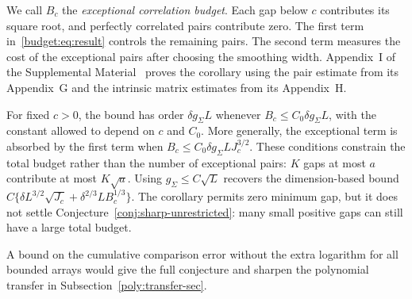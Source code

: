 \documentclass[11pt,letterpaper,twoside,leqno]{article}
\theoremstyle{bookplain}
\theoremstyle{bookremark}
\begin{document}
We call $B_c$ the \emph{exceptional correlation budget}. Each gap
below $c$ contributes its square root, and perfectly correlated pairs
contribute zero. The first term in~\eqref{budget:eq:result} controls
the remaining pairs. The second term measures the cost of the
exceptional pairs after choosing the smoothing width. Appendix~I of the
Supplemental Material~\cite{Supplement2026} proves the corollary using
the pair estimate from its Appendix~G and the intrinsic matrix estimates
from its Appendix~H.

For fixed $c>0$, the bound has order $\delta g_\Sigma L$ whenever
$B_c\le C_0\delta g_\Sigma L$, with the constant allowed to depend
on $c$ and $C_0$. More generally, the exceptional term is absorbed
by the first term when $B_c\le C_0\delta g_\Sigma LJ_c^{3/2}$.
These conditions constrain the total budget rather than the number
of exceptional pairs: $K$ gaps at most $a$ contribute at most
$K\sqrt a$. Using $g_\Sigma\le C\sqrt L$ recovers the dimension-based
bound $C\{\delta L^{3/2}\sqrt{J_c}+\delta^{2/3}LB_c^{1/3}\}$.
The corollary permits zero minimum gap, but it does not settle
Conjecture~\ref{conj:sharp-unrestricted}: many small positive gaps
can still have a large total budget.


A bound on the cumulative comparison error without the extra logarithm for all bounded arrays would give the full conjecture
and sharpen the polynomial transfer in Subsection~\ref{poly:transfer-sec}.
\end{document}
